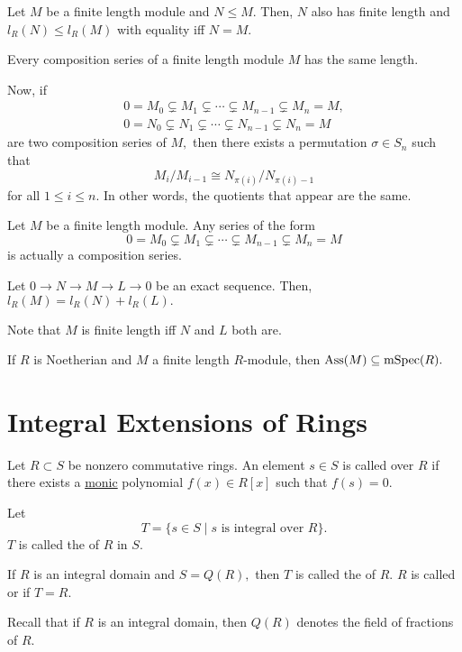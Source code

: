 \documentclass[12pt]{article}	%
\DeclareMathOperator{\mSpec}{mSpec}
\begin{document}
\begin{prop}
	Let $M$ be a finite length module and $N \le M.$ Then, $N$ also has finite length and $l_R(N) \le l_R(M)$ with equality iff $N = M.$
\end{prop}
\begin{thm}
	Every composition series of a finite length module $M$ has the same length.

	Now, if
	\begin{align*} 
		0 = M_0 \subsetneq M_1 \subsetneq \cdots \subsetneq M_{n-1} \subsetneq M_n = M,\\
		0 = N_0 \subsetneq N_1 \subsetneq \cdots \subsetneq N_{n-1} \subsetneq N_n = M
	\end{align*}
	are two composition series of $M,$ then there exists a permutation $\sigma \in S_n$ such that
	\begin{equation*} 
		M_{i}/M_{i - 1} \cong N_{\pi(i)}/N_{\pi(i) - 1}
	\end{equation*}
	for all $1 \le i \le n.$ In other words, the quotients that appear are the same.
\end{thm}

\begin{prop}
	Let $M$ be a finite length module. Any series of the form
	\begin{equation*} 
		0 = M_0 \subsetneq M_1 \subsetneq \cdots \subsetneq M_{n-1} \subsetneq M_n = M
	\end{equation*}
	is actually a composition series.
\end{prop}

\begin{prop}
	Let $0 \to N \to M \to L \to 0$ be an exact sequence. Then, $l_R(M) = l_R(N) + l_R(L).$
\end{prop}
Note that $M$ is finite length iff $N$ and $L$ both are.

\begin{prop}
	If $R$ is Noetherian and $M$ a finite length $R$-module, then $\Ass(M) \subset \mSpec(R).$
\end{prop}

\section{Integral Extensions of Rings}

\begin{defn}%
	Let $R \subset S$ be nonzero commutative rings. An element $s \in S$ is called  over $R$ if there exists a \underline{monic} polynomial $f(x) \in R[x]$ such that $f(s) = 0.$

	Let
	\begin{equation*} 
		T = \{s \in S \mid s \text{ is integral over }R\}.
	\end{equation*}
	$T$ is called the  of $R$ in $S.$

	If $R$ is an integral domain and $S = Q(R),$ then $T$ is called the  of $R.$ $R$ is called  or  if $T = R.$
\end{defn}
Recall that if $R$ is an integral domain, then $Q(R)$ denotes the field of fractions of $R.$
\end{document}
